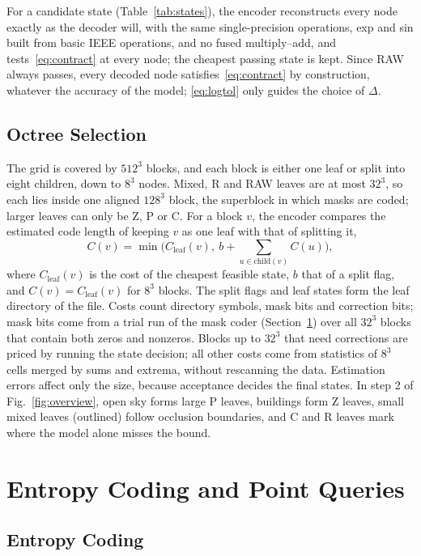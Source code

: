 \documentclass[conference]{IEEEtran}
\begin{document}
For a candidate state (Table~\ref{tab:states}), the encoder reconstructs every node exactly as the decoder will, with the same single-precision operations, exp and sin built from basic IEEE operations, and no fused multiply--add, and tests~\eqref{eq:contract} at every node; the cheapest passing state is kept. Since RAW always passes, every decoded node satisfies~\eqref{eq:contract} by construction, whatever the accuracy of the model; \eqref{eq:logtol} only guides the choice of $\Delta$.

\subsection{Octree Selection}

The grid is covered by $512^3$ blocks, and each block is either one leaf or split into eight children, down to $8^3$ nodes. Mixed, R and RAW leaves are at most $32^3$, so each lies inside one aligned $128^3$ block, the superblock in which masks are coded; larger leaves can only be Z, P or C. For a block $v$, the encoder compares the estimated code length of keeping $v$ as one leaf with that of splitting it,
\begin{equation}
C(v)=\min\Big(C_{\mathrm{leaf}}(v),\ b+\sum_{u\in\mathrm{child}(v)}C(u)\Big),
\label{eq:cost}
\end{equation}
where $C_{\mathrm{leaf}}(v)$ is the cost of the cheapest feasible state, $b$ that of a split flag, and $C(v)=C_{\mathrm{leaf}}(v)$ for $8^3$ blocks. The split flags and leaf states form the leaf directory of the file. Costs count directory symbols, mask bits and correction bits; mask bits come from a trial run of the mask coder (Section~\ref{sec:query}) over all $32^3$ blocks that contain both zeros and nonzeros. Blocks up to $32^3$ that need corrections are priced by running the state decision; all other costs come from statistics of $8^3$ cells merged by sums and extrema, without rescanning the data. Estimation errors affect only the size, because acceptance decides the final states. In step 2 of Fig.~\ref{fig:overview}, open sky forms large P leaves, buildings form Z leaves, small mixed leaves (outlined) follow occlusion boundaries, and C and R leaves mark where the model alone misses the bound.

\section{Entropy Coding and Point Queries}\label{sec:query}

\subsection{Entropy Coding}
\end{document}

